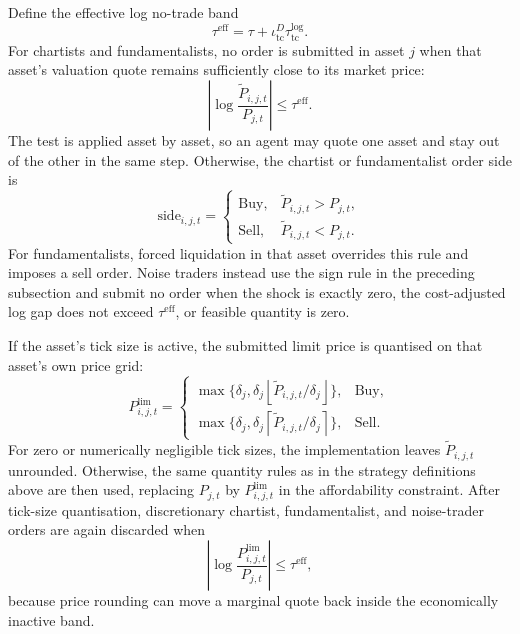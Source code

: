 \documentclass[12pt, a4paper]{article}
\begin{document}
    Define the effective log no-trade band
    \[
        \tau^{\mathrm{eff}}
        =
        \tau+\iota_{\mathrm{tc}}^D\tau_{\mathrm{tc}}^{\log}.
    \]
    For chartists and fundamentalists, no order is submitted in asset \(j\) when
    that asset's valuation quote remains sufficiently close to its market price:
    \begin{equation}
        \left|\log\frac{\tilde P_{i,j,t}}{P_{j,t}}\right|\le \tau^{\mathrm{eff}}.
    \end{equation}
    The test is applied asset by asset, so an agent may quote one asset and stay
    out of the other in the same step. Otherwise, the chartist or fundamentalist
    order side is
    \begin{equation}
        \mathrm{side}_{i,j,t}=
        \begin{cases}
            \mathrm{Buy}, & \tilde P_{i,j,t}>P_{j,t},\\
            \mathrm{Sell}, & \tilde P_{i,j,t}<P_{j,t}.
        \end{cases}
    \end{equation}
    For fundamentalists, forced liquidation in that asset overrides this rule and
    imposes a sell order. Noise traders instead use the sign rule in the preceding
    subsection and submit no order when the shock is exactly zero, the
    cost-adjusted log gap does not exceed \(\tau^{\mathrm{eff}}\), or feasible
    quantity is zero.

    If the asset's tick size is active, the submitted limit price is quantised on
    that asset's own price grid:
    \begin{equation}
        P_{i,j,t}^{\text{lim}}=
        \begin{cases}
            \max\{\delta_j,\delta_j\left\lfloor \tilde P_{i,j,t}/\delta_j\right\rfloor\}, & \mathrm{Buy},\\
            \max\{\delta_j,\delta_j\left\lceil \tilde P_{i,j,t}/\delta_j\right\rceil\}, & \mathrm{Sell}.
        \end{cases}
    \end{equation}
    For zero or numerically negligible tick sizes, the implementation leaves
    \(\tilde P_{i,j,t}\) unrounded. Otherwise, the same quantity rules as in the
    strategy definitions above are then used, replacing \(P_{j,t}\) by
    \(P_{i,j,t}^{\text{lim}}\) in the affordability constraint. After tick-size
    quantisation, discretionary chartist, fundamentalist, and noise-trader orders
    are again discarded when
    \[
        \left|\log\frac{P_{i,j,t}^{\text{lim}}}{P_{j,t}}\right|
        \le \tau^{\mathrm{eff}},
    \]
    because price rounding can move a marginal quote back inside the economically
    inactive band.
\end{document}
